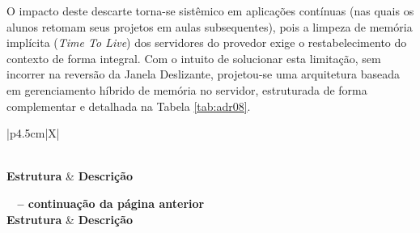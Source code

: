 O impacto deste descarte torna-se sistêmico em aplicações contínuas (nas quais os alunos retomam seus projetos em aulas subsequentes), pois a limpeza de memória implícita (\textit{Time To Live}) dos servidores do provedor exige o restabelecimento do contexto de forma integral. Com o intuito de solucionar esta limitação, sem incorrer na reversão da Janela Deslizante, projetou-se uma arquitetura baseada em gerenciamento híbrido de memória no servidor, estruturada de forma complementar e detalhada na Tabela \ref{tab:adr08}.

{
\footnotesize 
\renewcommand{\arraystretch}{1.1}

\begin{xltabular}{\textwidth}{|p{4.5cm}|X|}
    \caption{Registro de Decisão Arquitetural (ADR 08): Mitigação de Perda de Contexto (Memória Híbrida)}
    \label{tab:adr08} \\
    \toprule
    \textbf{Estrutura} & \textbf{Descrição} \\
    \midrule
    \endfirsthead

    {{\bfseries \tablename\ \thetable{} -- continuação da página anterior}} \\
    \toprule
    \textbf{Estrutura} & \textbf{Descrição} \\
    \midrule
    \endhead

    \midrule {} \\
    \endfoot

    \bottomrule
     \\
    \endlastfoot
    

\end{xltabular}}
